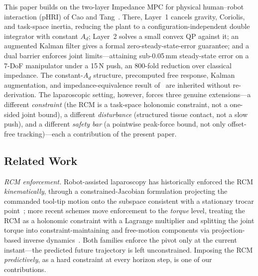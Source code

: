 This paper builds on the two-layer Impedance MPC for physical human--robot interaction (pHRI) of Cao and Tang~\cite{cao2026phri}. There, Layer~1 cancels gravity, Coriolis, and task-space inertia, reducing the plant to a configuration-independent double integrator with constant $A_d$; Layer~2 solves a small convex QP against it; an augmented Kalman filter gives a formal zero-steady-state-error guarantee; and a dual barrier enforces joint limits---attaining sub-0.05\,mm steady-state error on a 7-DoF manipulator under a 15\,N push, an 800-fold reduction over classical impedance. The constant-$A_d$ structure, precomputed free response, Kalman augmentation, and impedance-equivalence result of~\cite{cao2026phri} are inherited without re-derivation. The laparoscopic setting, however, forces three genuine extensions---a different \emph{constraint} (the RCM is a task-space holonomic constraint, not a one-sided joint bound), a different \emph{disturbance} (structured tissue contact, not a slow push), and a different \emph{safety bar} (a pointwise peak-force bound, not only offset-free tracking)---each a contribution of the present paper.

\subsection{Related Work}

\emph{RCM enforcement.} Robot-assisted laparoscopy has historically enforced the RCM \emph{kinematically}, through a constrained-Jacobian formulation projecting the commanded tool-tip motion onto the subspace consistent with a stationary trocar point~\cite{aghakhani2013}; more recent schemes move enforcement to the \emph{torque} level, treating the RCM as a holonomic constraint with a Lagrange multiplier and splitting the joint torque into constraint-maintaining and free-motion components via projection-based inverse dynamics~\cite{sandoval2018}. Both families enforce the pivot only at the current instant---the predicted future trajectory is left unconstrained. Imposing the RCM \emph{predictively}, as a hard constraint at every horizon step, is one of our contributions.

